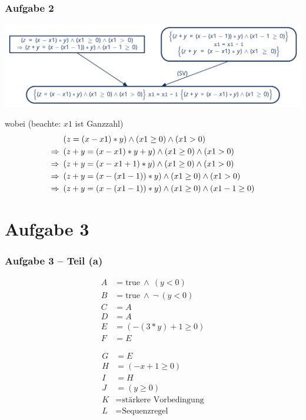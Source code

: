 \documentclass{beamer}
\newcommand{\logand}{ \ \land \ }
\begin{document}
\begin{frame} \frametitle{Aufgabe 2}
	\footnotesize
	\begin{center}
		\includegraphics[width=\linewidth]{tut12-abb}
	\end{center}
	wobei (beachte: $x1$ ist Ganzzahl)
	\begin{align*}
		&(z = (x - x1) * y) \land (x1 \ge 0) \land (x1 > 0) \\
		\Rightarrow \enskip &(z + y = (x - x1) * y + y) \land (x1 \ge 0) \land (x1 > 0) \\
		\Rightarrow \enskip &(z + y = (x - x1 + 1) * y) \land (x1 \ge 0) \land (x1 > 0) \\
		\Rightarrow \enskip &(z + y = (x - (x1 - 1)) * y) \land (x1 \ge 0) \land (x1 > 0) \\
		\Rightarrow \enskip &(z + y = (x - (x1 - 1)) * y) \land (x1 \ge 0) \land (x1 - 1 \ge 0)
	\end{align*}
\end{frame}

\section{Aufgabe 3}

\begin{frame} \frametitle{Aufgabe 3 -- Teil (a)}
	\begin{minipage}{\dimexpr0.5\linewidth-\fboxrule-\fboxsep}
		\begin{align*}
			A &= \text{true} \logand (y < 0) \\
			B &= \text{true} \logand \lnot \ (y < 0) \\
			C &= A \\
			D &= A \\
			E &= ( -(3*y) + 1 \ge 0) \\
			F &= E 
		\end{align*}
	\end{minipage}
	\begin{minipage}{\dimexpr0.5\linewidth-\fboxrule-\fboxsep}
		\begin{align*}
		G &= E \\
		H &= (-x + 1 \ge 0) \\
		I &= H \\
		J &= (y \ge 0) \\
		K &= \text{stärkere Vorbedingung} \\
		L &= \text{Sequenzregel} 
		\end{align*}
	\end{minipage}	
\end{frame}
\end{document}
